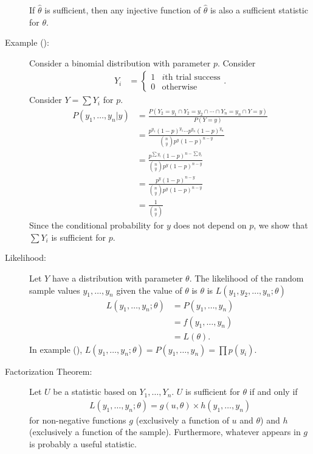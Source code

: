 \documentclass[10pt]{extarticle}
\begin{document}
\begin{description}
      If $\hat{\theta}$ is sufficient, then any injective function of $\hat{\theta}$ is also a sufficient statistic for $\theta$.
    \item[Example (\textasteriskcentered):] Consider a binomial distribution with parameter $p$. Consider 
      \begin{align*}
        Y_i &= \begin{cases}
          1& \text{$i$th trial success}\\
          0 & \text{otherwise}
        \end{cases}.
      \end{align*}
      Consider $Y = \sum Y_i$ for $p$.
      \begin{align*}
        P(y_1,\dots,y_n | y) &= \frac{P(Y_2=y_1\cap Y_2=y_2 \cap \cdots \cap Y_n = y_n \cap Y=y)}{P(Y=y)}\\
                             &= \frac{p^{y_1}(1-p)^{y_1} \cdots p^{y_n}(1-p)^{y_n}}{{n\choose y} p^{y}(1-p)^{n-y}}\\
                             &= \frac{p^{\sum y_i}(1-p)^{n-\sum y_i}}{{n\choose y}p^{y}(1-p)^{n-y}}\\
                             &= \frac{p^{y}(1-p)^{n-y}}{{n\choose y}p^{y}(1-p)^{n-y}}\\
                             &= \frac{1}{{n\choose y}}
      \end{align*}
      Since the conditional probability for $y$ does not depend on $p$, we show that $\sum Y_i$ is sufficient for $p$.
    \item[Likelihood:] Let $Y$ have a distribution with parameter $\theta$. The likelihood of the random sample values $y_1,\dots,y_n$ given the value of $\theta$ is  $\theta$ is $L(y_1,y_2,\dots,y_n;\theta)$
      \begin{align*}
        L(y_1,\dots,y_n; \theta) &= P(y_1,\dots,y_n) \tag*{if discrete}\\
                                 &= f(y_1,\dots,y_n) \tag*{if continuous}\\
                                 &= L(\theta).
      \end{align*}
      In example (\textasteriskcentered), $L(y_1,\dots,y_n;\theta) = P(y_1,\dots,y_n) = \prod p(y_i)$.
    \item[Factorization Theorem:] Let $U$ be a statistic based on $Y_1,\dots,Y_n$. $U$ is sufficient for $\theta$ if and only if
      \begin{align*}
        L(y_1,\dots,y_n;\theta) = g(u,\theta)\times h(y_1,\dots,y_n)
      \end{align*}
      for non-negative functions $g$ (exclusively a function of $u$ and $\theta$) and $h$ (exclusively a function of the sample). Furthermore, whatever appears in $g$ is probably a useful statistic.\\


\end{description}
\end{document}

